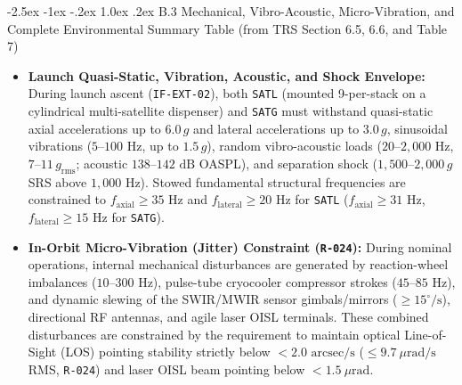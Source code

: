 \documentclass[11pt,a4paper]{article}
\makeatletter
\renewcommand\subsection{\@startsection{subsection}{2}{\z@}%
    {-2.5ex \@plus -1ex \@minus -.2ex}%
    {1.0ex \@plus .2ex}%
    {\normalfont\large\bfseries\sffamily\color{SubHeadingBlue}}}
\providecommand{\abbr}[1]{#1}
\makeatother
\begin{document}
\subsection{B.3 Mechanical, Vibro-Acoustic, Micro-Vibration, and Complete Environmental Summary Table (from TRS Section 6.5, 6.6, and Table 7)}

\begin{itemize}
    \item \textbf{Launch Quasi-Static, Vibration, Acoustic, and Shock Envelope:} During launch ascent (\texttt{IF-EXT-02}), both \texttt{SATL} (mounted 9-per-stack on a cylindrical multi-satellite dispenser) and \texttt{SATG} must withstand quasi-static axial accelerations up to $6.0\,g$ and lateral accelerations up to $3.0\,g$, sinusoidal vibrations ($5\text{--}100\text{ Hz}$, up to $1.5\,g$), random vibro-acoustic loads ($20\text{--}2{,}000\text{ Hz}$, $7\text{--}11\,g_{\text{rms}}$; acoustic $138\text{--}142\text{ dB}$ OASPL), and separation shock ($1{,}500\text{--}2{,}000\,g$ SRS above $1{,}000\text{ Hz}$). Stowed fundamental structural frequencies are constrained to $f_{\text{axial}} \ge 35\text{ Hz}$ and $f_{\text{lateral}} \ge 20\text{ Hz}$ for \texttt{SATL} ($f_{\text{axial}} \ge 31\text{ Hz}$, $f_{\text{lateral}} \ge 15\text{ Hz}$ for \texttt{SATG}).
    \item \textbf{In-Orbit Micro-Vibration (Jitter) Constraint (\texttt{R-024}):} During nominal operations, internal mechanical disturbances are generated by reaction-wheel imbalances ($10\text{--}300\text{ Hz}$), pulse-tube cryocooler compressor strokes ($45\text{--}85\text{ Hz}$), and dynamic slewing of the \abbr{SWIR}/\abbr{MWIR} sensor gimbals/mirrors ($\ge 15^\circ/\text{s}$), directional \abbr{RF} antennas, and agile laser \abbr{OISL} terminals. These combined disturbances are constrained by the requirement to maintain optical Line-of-Sight (\abbr{LOS}) pointing stability strictly below $< 2.0\text{ arcsec/s}$ ($\le 9.7~\mu\mathrm{rad/s}$ RMS, \texttt{R-024}) and laser \abbr{OISL} beam pointing below $< 1.5~\mu\mathrm{rad}$.
\end{itemize}
\end{document}
